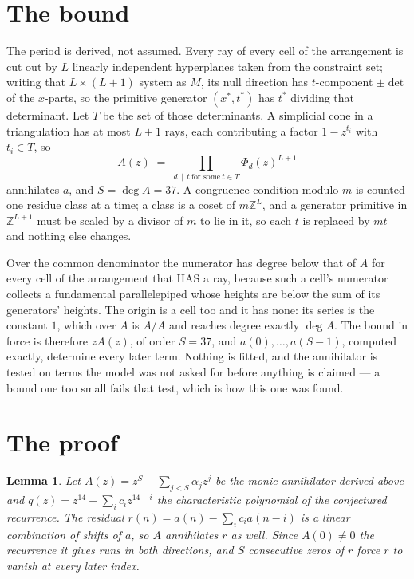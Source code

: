 \documentclass[11pt,a4paper]{article}
\theoremstyle{plain}
\newtheorem{lemma}[theorem]{Lemma}
\theoremstyle{definition}
\begin{document}
\section{The bound}

The period is derived, not assumed. Every ray of every cell of the arrangement is cut out by
$L$ linearly independent hyperplanes taken from the constraint set; writing that $L\times(L+1)$
system as $M$, its null direction has $t$-component $\pm\det$ of the $x$-parts, so the
primitive generator $(x^*,t^*)$ has $t^*$ dividing that determinant. Let $T$ be the set of
those determinants. A simplicial cone in a triangulation has at most $L+1$ rays, each
contributing a factor $1-z^{t_i}$ with $t_i\in T$, so
\[
A(z)\;=\;\prod_{d\,\mid\,t\ \text{for some}\ t\in T}\Phi_d(z)^{L+1}
\]
annihilates $a$, and $S=\deg A=37$. A congruence condition modulo $m$ is counted one residue
class at a time; a class is a coset of $m\mathbb{Z}^L$, and a generator primitive in
$\mathbb{Z}^{L+1}$ must be scaled by a divisor of $m$ to lie in it, so each $t$ is replaced
by $mt$ and nothing else changes.

Over the common denominator the numerator has degree below that of $A$ for every cell of the
arrangement that HAS a ray, because such a cell's numerator collects a fundamental
parallelepiped whose heights are below the sum of its generators' heights. The origin is a cell
too and it has none: its series is the constant $1$, which over $A$ is $A/A$ and reaches degree
exactly $\deg A$. The bound in force is therefore $zA(z)$, of order $S=37$, and
$a(0),\dots,a(S-1)$, computed exactly, determine every later term. Nothing is fitted, and the
annihilator is tested on terms the model was not asked for before anything is claimed --- a
bound one too small fails that test, which is how this one was found.

\section{The proof}

\begin{lemma}\label{lem:crit}
Let $A(z)=z^S-\sum_{j<S}\alpha_jz^{j}$ be the monic annihilator derived above and
$q(z)=z^{14}-\sum_ic_iz^{14-i}$ the characteristic polynomial of the conjectured
recurrence. The residual $r(n)=a(n)-\sum_ic_ia(n-i)$ is a linear combination of shifts of $a$,
so $A$ annihilates $r$ as well. Since $A(0)\ne0$ the recurrence it gives runs in both
directions, and $S$ consecutive zeros of $r$ force $r$ to vanish at every later index.
\end{lemma}
\end{document}
